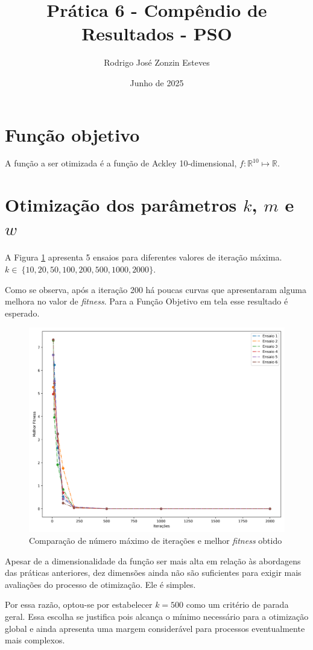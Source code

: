 \documentclass[12pt]{article}
\author{Rodrigo José Zonzin Esteves}
\date{Junho de 2025}
\title{Prática 6 - Compêndio de Resultados - PSO}
\begin{document}
	\maketitle
	
	\section{Função objetivo}
	A função a ser otimizada é a função de Ackley 10-dimensional, $f: \mathbb{R}^{10} \mapsto \mathbb{R}$. 
	
	
	\section{Otimização dos parâmetros $k$, $m$ e $w$ }
	
	A Figura \ref{fig_variacaoiteracoes} apresenta 5 ensaios para diferentes valores de iteração máxima. \\
	$k \in~\{10, 20, 50, 100, 200, 500, 1000, 2000\}$.
	
	Como se observa, após a iteração 200 há poucas curvas que apresentaram alguma melhora no valor de \textit{fitness}. Para a Função Objetivo em tela esse resultado é esperado. 	
	\begin{figure}[h!]
		\centering
		\includegraphics[width=0.68\linewidth]{../variacao_iteracoes}
		\caption{Comparação de número máximo de iterações e melhor \textit{fitness} obtido}
		\label{fig_variacaoiteracoes}
	\end{figure}
	 Apesar de a dimensionalidade da função ser mais alta em relação às abordagens das práticas anteriores, dez dimensões ainda não são suficientes para exigir mais avaliações do processo de otimização. Ele é simples. 
	
	Por essa razão, optou-se por estabelecer $k=500$ como um critério de parada geral. Essa escolha se justifica pois alcança o mínimo necessário para a otimização global e ainda apresenta uma margem considerável para processos eventualmente mais complexos. 
	
\end{document}
